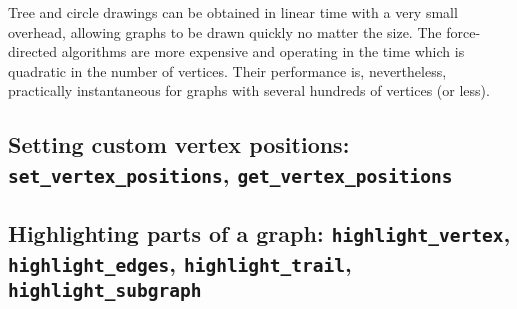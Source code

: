 \documentclass[a4paper,11pt]{article}
\begin{document}
Tree and circle drawings can be obtained in linear time with a very small overhead, allowing graphs to be drawn quickly no matter the size. The force-directed algorithms are more expensive and operating in the time which is quadratic in the number of vertices. Their performance is, nevertheless, practically instantaneous for graphs with several hundreds of vertices (or less).

\subsection{Setting custom vertex positions: {\tt set\_vertex\_positions}, {\tt get\_vertex\_positions}}

\subsection{Highlighting parts of a graph: {\tt highlight\_vertex}, {\tt highlight\_edges}, {\tt highlight\_trail}, {\tt highlight\_subgraph}}
\end{document}
